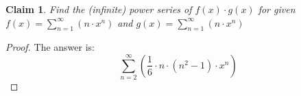 \documentclass{article}
\newtheorem{theorem}{Claim}
\begin{document}
\begin{theorem}
Find the (infinite) power series of $f(x) \cdot g(x)$ for given $f(x) = \sum_{n=1}^\infty \left(n \cdot x^n\right)$ and $g(x) = \sum_{n=1}^\infty \left(n \cdot x^n\right)$
\end{theorem}

\begin{proof}
The answer is:
\[
\sum_{n=2}^\infty\left(\frac{1}{6}\cdot n\cdot\left(n^2-1\right)\cdot x^n\right)
\]
\end{proof}
\end{document}
